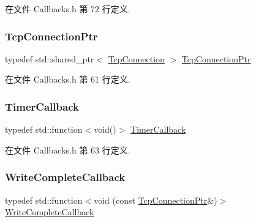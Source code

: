 在文件 Callbacks.\+h 第 72 行定义.

\mbox{\label{namespacemuduo_1_1net_ab91a46e9290926aa692450e46cfc9039}} 
\subsubsection{\texorpdfstring{Tcp\+Connection\+Ptr}{TcpConnectionPtr}}
{\footnotesize\ttfamily typedef std\+::shared\+\_\+ptr$<$ \hyperlink{classmuduo_1_1net_1_1TcpConnection}{Tcp\+Connection} $>$ \hyperlink{namespacemuduo_1_1net_ab91a46e9290926aa692450e46cfc9039}{Tcp\+Connection\+Ptr}}



在文件 Callbacks.\+h 第 61 行定义.

\mbox{\label{namespacemuduo_1_1net_ad4bd8788fd4c609b90c78920572bec50}} 
\subsubsection{\texorpdfstring{Timer\+Callback}{TimerCallback}}
{\footnotesize\ttfamily typedef std\+::function$<$void()$>$ \hyperlink{namespacemuduo_1_1net_ad4bd8788fd4c609b90c78920572bec50}{Timer\+Callback}}



在文件 Callbacks.\+h 第 63 行定义.

\mbox{\label{namespacemuduo_1_1net_a525c3730bfefb763975b035ebc88a63d}} 
\subsubsection{\texorpdfstring{Write\+Complete\+Callback}{WriteCompleteCallback}}
{\footnotesize\ttfamily typedef std\+::function$<$void (const \hyperlink{namespacemuduo_1_1net_ab91a46e9290926aa692450e46cfc9039}{Tcp\+Connection\+Ptr}\&)$>$ \hyperlink{namespacemuduo_1_1net_a525c3730bfefb763975b035ebc88a63d}{Write\+Complete\+Callback}}



